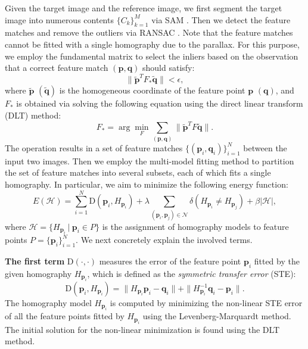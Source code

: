\documentclass[10pt,twocolumn,letterpaper]{article}
\begin{document}
Given the target image and the reference image, we first segment the target image into numerous contents $\{C_k\}_{k=1}^M$ via SAM \cite{kirillov2023segment}. Then we detect the feature matches and remove the outliers via RANSAC \cite{fischler1981random}. Note that the feature matches cannot be fitted with a single homography due to the parallax. For this purpose, we employ the fundamental matrix to select the inliers based on the observation that a correct feature match $(\mathbf{p}, \mathbf{q})$ should satisfy:
\begin{equation*}
	\|\tilde{\mathbf{p}}^T F_* \tilde{\mathbf{q}}\|<\epsilon,
\end{equation*}
where $\tilde{\mathbf{p}}$ $(\tilde{\mathbf{q}})$ is the homogeneous coordinate of the feature point $\mathbf{p}$ $(\mathbf{q})$, and $F_*$ is obtained via solving the following equation using the direct linear transform (DLT) method:
\begin{equation}
	F_*=\arg\min_F \sum_{(\mathbf{p}, \mathbf{q})}\|\tilde{\mathbf{p}}^T F \tilde{\mathbf{q}}\|.
\end{equation}
The operation results in a set of feature matches $\{(\mathbf{p}_i, \mathbf{q}_i)\}_{i=1}^N$ between the input two images. Then we employ the multi-model fitting method \cite{isack2012energy} to partition the set of feature matches into several subsets, each of which fits a single homography. In particular, we aim to minimize the following energy function:
\begin{equation}
	E(\mathcal{H})=\sum_{i=1}^N \mathrm{D}(\mathbf{p}_i, H_{\mathbf{p}_i})
	+\lambda \sum_{(\mathbf{p}_i,\mathbf{p}_j)\in \mathcal{N}}\delta(H_{\mathbf{p}_i}\neq H_{\mathbf{p}_j})+\beta |\mathcal{H}|,
	\label{eq:1}
\end{equation}
where $\mathcal{H}=\{H_{\mathbf{p}_i}\ |\ \mathbf{p}_i\in P\}$ is the assignment of homography models to feature points $P=\{\mathbf{p}_i\}_{i=1}^N$. We next concretely explain the involved terms.


\noindent\textbf{The first term} $\mathrm{D}(\cdot,\cdot)$ measures the error of the feature point $\mathbf{p}_i$ fitted by the given homography $H_{\mathbf{p}_i}$, which is defined as the \textit{symmetric transfer error} (STE):
\begin{equation}
	\mathrm{D} (\mathbf{p}_i, H_{\mathbf{p}_i})=\|H_{\mathbf{p}_i}\mathbf{p}_i-\mathbf{q}_i\|+\|H^{-1}_{\mathbf{p}_i}\mathbf{q}_i-\mathbf{p}_i\|.	
\end{equation}
The homography model $H_{\mathbf{p}_i}$ is computed by minimizing the non-linear STE error of all the feature points fitted by $H_{\mathbf{p}_i}$ using the Levenberg-Marquardt method. The initial solution for the non-linear minimization is found using the DLT method.
\end{document}
